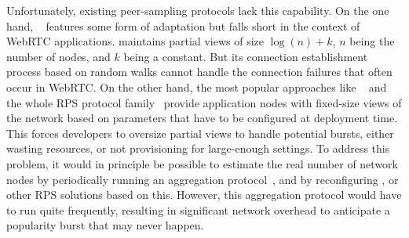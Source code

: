 Unfortunately, existing peer-sampling protocols
lack this capability. On the one hand,
\SCAMP~\cite{ganesh2001scamp,ganesh2003peer} features some form of adaptation
but falls short in the context of WebRTC applications. \SCAMP maintains partial
views of size $\log(n)+k$, $n$ being the number of nodes, and $k$ being a
constant. But its connection establishment process based on random walks cannot
handle the connection failures that often occur in WebRTC. On the other hand,
the most popular approaches like \CYCLON~\cite{voulgaris2005cyclon} and the
whole RPS protocol family~\cite{jelasity2007gossip} provide application nodes
with fixed-size views of the network based on parameters that have to be
configured at deployment time. This forces developers to oversize partial views
to handle potential bursts, either wasting resources, or not provisioning for
large-enough settings.
To address this problem, it would in principle be possible to estimate
the real number of network nodes by periodically running an
aggregation protocol~\cite{montresor2004robust}, and by reconfiguring
\CYCLON, or other RPS solutions based on this. However, this aggregation
protocol would have to run quite frequently, resulting in significant
network overhead to anticipate a popularity burst that may never
happen.


